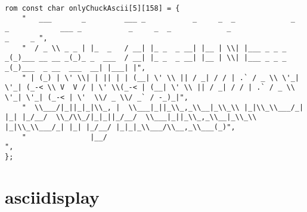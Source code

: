 \begin{lstlisting}
rom const char onlyChuckAscii[5][158] = {
	"   ___       _         ___ _           _     _  _             _             _            ___ _           _     _  _             _                    _     _ ",
	"  / _ \\ _ _ | |_  _   / __| |_ _  _ __| |__ | \\| |___ _ _ _ _(_)___ __ __ _(_)_ _  ___  / __| |_ _  _ __| |__ | \\| |___ _ _ _ _(_)___  _ __  ___  __| |___| |",
	" | (_) | \' \\| | || | | (__| \' \\ || / _| / / | .` / _ \\ \'_| \'_| (_-< \\ V  V / | \' \\(_-< | (__| \' \\ || / _| / / | .` / _ \\ \'_| \'_| (_-< | \'  \\/ _ \\/ _` / -_)_|",
	"  \\___/|_||_|_|\\_, |  \\___|_||_\\_,_\\__|_\\_\\ |_|\\_\\___/_| |_| |_/__/  \\_/\\_/|_|_||_/__/  \\___|_||_\\_,_\\__|_\\_\\ |_|\\_\\___/_| |_| |_/__/ |_|_|_\\___/\\__,_\\___(_)",
	"               |__/                                                                                                                                          ",
};
\end{lstlisting}


\section{asciidisplay}
\label{asciidisplay}

